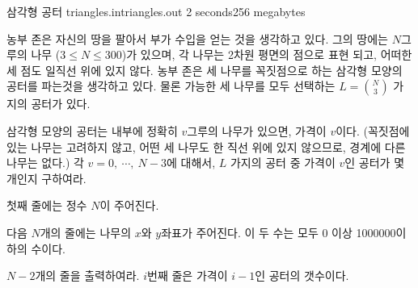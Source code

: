 \begin{problem}{삼각형 공터}
	{triangles.in}{triangles.out}
	{2 seconds}{256 megabytes}{}
	

	농부 존은 자신의 땅을 팔아서 부가 수입을 얻는 것을 생각하고 있다. 그의 땅에는 $N$그루의 나무 ($3 \le N \le 300$)가 있으며, 각 나무는 2차원 평면의 점으로 표현 되고, 어떠한 세 점도 일직선 위에 있지 않다. 농부 존은 세 나무를 꼭짓점으로 하는 삼각형 모양의 공터를 파는것을 생각하고 있다. 물론 가능한 세 나무를 모두 선택하는 $L={N \choose 3}$ 가지의 공터가 있다.

	삼각형 모양의 공터는 내부에 정확히 $v$그루의 나무가 있으면, 가격이 $v$이다. (꼭짓점에 있는 나무는 고려하지 않고, 어떤 세 나무도 한 직선 위에 있지 않으므로, 경계에 다른 나무는 없다.) 각 $v=0, \ \cdots, \ N-3$에 대해서, $L$ 가지의 공터 중 가격이 $v$인 공터가 몇 개인지 구하여라.

	
	\InputFile
	
	첫째 줄에는 정수 $N$이 주어진다.
	
	다음 $N$개의 줄에는 나무의 $x$와 $y$좌표가 주어진다. 이 두 수는 모두 0 이상 1000000이하의 수이다.
	
	\OutputFile
	
	$N-2$개의 줄을 출력하여라. $i$번째 줄은 가격이 $i-1$인 공터의 갯수이다.
	
	\Examples
	
	\begin{example}
	\end{example}

	
\end{problem}


